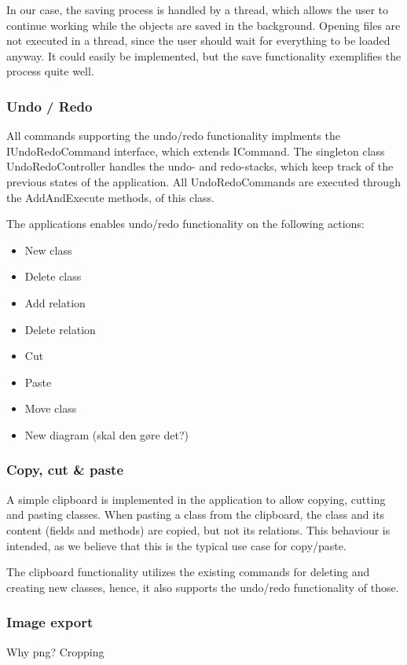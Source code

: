 In our case, the saving process is handled by a thread, which allows the user to continue working while the objects are saved in the background. Opening files are not executed in a thread, since the user should wait for everything to be loaded anyway. It could easily be implemented, but the save functionality exemplifies the process quite well.


\subsubsection{Undo / Redo}
All commands supporting the undo/redo functionality implments the IUndoRedoCommand interface, which extends ICommand. The singleton class UndoRedoController handles the undo- and redo-stacks, which keep track of the previous states of the application. All UndoRedoCommands are executed through the AddAndExecute methods, of this class.

The applications enables undo/redo functionality on the following actions:


\begin{itemize}
	\item New class
	\item Delete class
	\item Add relation
	\item Delete relation
	\item Cut
	\item Paste
	\item Move class
	\item New diagram (skal den gøre det?)
\end{itemize}


\subsubsection{Copy, cut \& paste}
A simple clipboard is implemented in the application to allow copying, cutting and pasting classes. When pasting a class from the clipboard, the class and its content (fields and methods) are copied, but not its relations. This behaviour is intended, as we believe that this is the typical use case for copy/paste.

The clipboard functionality utilizes the existing commands for deleting and creating new classes, hence, it also supports the undo/redo functionality of those.


\subsubsection{Image export}
Why png? Cropping

